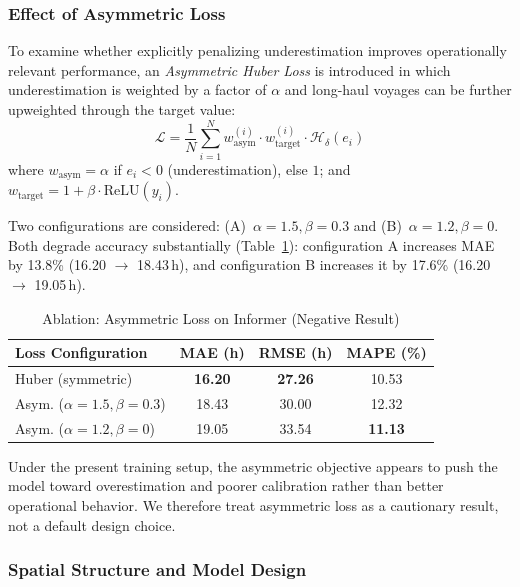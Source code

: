 \documentclass[conference]{IEEEtran}
\begin{document}
\subsubsection{Effect of Asymmetric Loss}

To examine whether explicitly penalizing underestimation improves operationally relevant performance, an \textit{Asymmetric Huber Loss} is introduced in which underestimation is weighted by a factor of $\alpha$ and long-haul voyages can be further upweighted through the target value:
\begin{equation}
    \mathcal{L} = \frac{1}{N} \sum_{i=1}^{N} w_{\text{asym}}^{(i)} \cdot w_{\text{target}}^{(i)} \cdot \mathcal{H}_\delta(e_i)
    \label{eq:loss}
\end{equation}
where $w_{\text{asym}} = \alpha$ if $e_i < 0$ (underestimation), else $1$; and $w_{\text{target}} = 1 + \beta \cdot \text{ReLU}(y_i)$.

Two configurations are considered: (A)~$\alpha{=}1.5, \beta{=}0.3$ and (B)~$\alpha{=}1.2, \beta{=}0$. Both degrade accuracy substantially (Table~\ref{tab:ablation_loss}): configuration A increases MAE by 13.8\% (16.20 $\to$ 18.43\,h), and configuration B increases it by 17.6\% (16.20 $\to$ 19.05\,h).

\begin{table}[t]
    \centering
    \caption{Ablation: Asymmetric Loss on Informer (Negative Result)}
    \label{tab:ablation_loss}
    \begin{tabular}{lccc}
        \toprule
        \textbf{Loss Configuration} & \textbf{MAE (h)} & \textbf{RMSE (h)} & \textbf{MAPE (\%)} \\
        \midrule
        Huber (symmetric) & \textbf{16.20} & \textbf{27.26} & 10.53 \\
        Asym. ($\alpha{=}1.5, \beta{=}0.3$) & 18.43 & 30.00 & 12.32 \\
        Asym. ($\alpha{=}1.2, \beta{=}0$) & 19.05 & 33.54 & \textbf{11.13} \\
        \bottomrule
    \end{tabular}
\end{table}

Under the present training setup, the asymmetric objective appears to push the model toward overestimation and poorer calibration rather than better operational behavior. We therefore treat asymmetric loss as a cautionary result, not a default design choice.

\subsubsection{Spatial Structure and Model Design}
\end{document}
